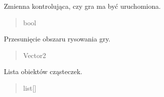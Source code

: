 \documentclass[letterpaper,10pt,polish]{sphinxmanual}
\begin{document}
\begin{fulllineitems}
\begin{fulllineitems}
\end{fulllineitems}


\begin{fulllineitems}
\label{\detokenize{main:main.Main.is_running}}
\pysigstartsignatures
{}
\pysigstopsignatures
\sphinxAtStartPar
Zmienna kontrolująca, czy gra ma być uruchomiona.
\begin{quote}\begin{description}
\sphinxAtStartPar
bool

\end{description}\end{quote}

\end{fulllineitems}


\begin{fulllineitems}
\label{\detokenize{main:main.Main.scroll}}
\pysigstartsignatures
{}
\pysigstopsignatures
\sphinxAtStartPar
Przesunięcie obszaru rysowania gry.
\begin{quote}\begin{description}
\sphinxAtStartPar
Vector2

\end{description}\end{quote}

\end{fulllineitems}


\begin{fulllineitems}
\label{\detokenize{main:main.Main.particles}}
\pysigstartsignatures
{}
\pysigstopsignatures
\sphinxAtStartPar
Lista obiektów cząsteczek.
\begin{quote}\begin{description}
\sphinxAtStartPar
list{[}{\hyperref[\detokenize{particle:particle.Particle}]{}}{]}

\end{description}\end{quote}


\end{fulllineitems}
\end{fulllineitems}
\end{document}
